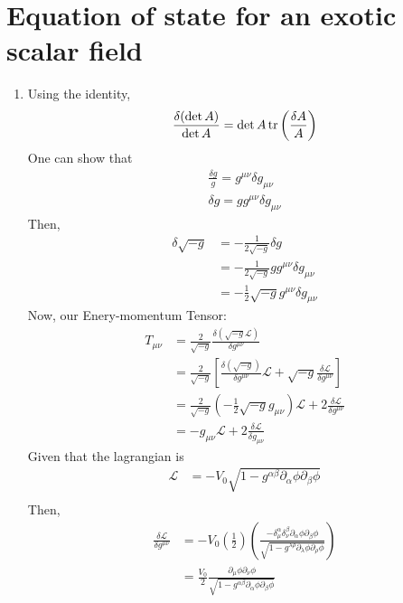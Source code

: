 \section{Equation of state for an exotic scalar field}
\newcommand{\Lagr}{\mathcal{L}}
\begin{enumerate}[label=(\alph*)]
	\item 
	Using the identity,
\begin{equation}
	\frac{\delta(\det A)}{\det A}  = \det A \trace{\left(\frac{\delta A}{A}\right)}
\end{equation}
	One can show that 
\begin{align}
	\frac{\delta g}{g} = g^{\mu\nu} \delta g_{\mu\nu} \\
	\delta g = g g^{\mu\nu} \delta g_{\mu\nu} 
\end{align}
Then,
\begin{align}
	\delta \sqrt{-g} &= -\frac{1}{2 \sqrt{-g}} \delta g \\
				&= -\frac{1}{2 \sqrt{-g}} g g^{\mu\nu} \delta g_{\mu\nu} \\
				&= -\frac{1}{2} \sqrt{-g} g^{\mu\nu} \delta g_{\mu\nu} 
\end{align}
Now, our Enery-momentum Tensor:
\begin{align}
	T_{\mu\nu} 	&=  \frac{2}{\sqrt{-g}} \frac{\delta(\sqrt{-g}\mathcal{L})}{ \delta g^{\mu\nu}} \\
				&= \frac{2}{\sqrt{-g}} \left[ \frac{\delta(\sqrt{-g})}{\delta g^{\mu\nu}} \mathcal{L}+ \sqrt{-g}\frac{\delta\mathcal{L}}{\delta g^{\mu\nu}}  \right] \\
				&= \frac{2}{\sqrt{-g}} \left( -\frac{1}{2} \sqrt{-g} g_{\mu\nu} \right) \mathcal{L} + 2\frac{\delta \mathcal{L}}{\delta g^{\mu\nu}}  \\
				&= -g_{\mu\nu} \mathcal{L} + 2\frac{\delta\mathcal{L}}{\delta g_{\mu\nu}}  
\end{align}
Given that the lagrangian is \\
\begin{align}
		\Lagr &= -V_0 \sqrt{1-g^{\alpha\beta} \partial_\alpha \phi \partial_\beta \phi } \\
\end{align}
Then,
\begin{align}
\frac{\delta\mathcal{L}}{\delta g^{\mu\nu}} &= -V_0 \left(\frac{1}{2}\right) \left( \frac{-\delta^\alpha_\mu \delta^\beta_\nu \partial_\alpha \phi \partial_\beta \phi}{\sqrt{1-g^{\lambda\rho} \partial_\lambda\phi \partial_\rho\phi }} \right) \\
									&= \frac{V_0}{2} \frac{\partial_\mu \phi \partial_\nu \phi}{\sqrt{1-g^{\alpha\beta} \partial_\alpha \phi \partial_\beta \phi }}
\end{align}


\end{enumerate}
